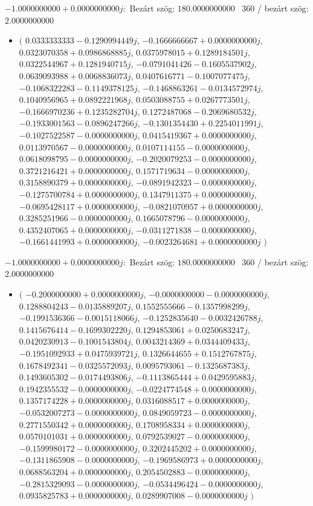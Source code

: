 \documentclass[14pt,a4paper]{article}
\begin{document}
$-1.0000000000+0.0000000000j$:\
Bezárt szög: $180.0000000000$ \
360 / bezárt szög: $2.0000000000$\
\begin{itemize}
\item
$\big($
$0.0333333333-0.1290994449j$, $-0.1666666667+0.0000000000j$, $0.0323070358+0.0986868885j$, $0.0375978015+0.1289184501j$, $0.0322544967+0.1281940715j$, $-0.0791041426-0.1605537902j$, $0.0639093988+0.0068836073j$, $0.0407616771-0.1007077475j$, $-0.1068322283-0.1149378125j$, $-0.1468863261-0.0134572974j$, $0.1040956965+0.0892221968j$, $0.0503088755+0.0267773501j$, $-0.1666970236+0.1235282704j$, $0.1272487068-0.2069680532j$, $-0.1933001563-0.0896247266j$, $-0.1301354430+0.2254011991j$, $-0.1027522587-0.0000000000j$, $0.0415419367+0.0000000000j$, $0.0113970567-0.0000000000j$, $0.0107114155-0.0000000000j$, $0.0618098795-0.0000000000j$, $-0.2020079253-0.0000000000j$, $0.3721216421+0.0000000000j$, $0.1571719634-0.0000000000j$, $0.3158890379+0.0000000000j$, $-0.0891942323-0.0000000000j$, $-0.1275700784+0.0000000000j$, $0.1347911375+0.0000000000j$, $-0.0695428117+0.0000000000j$, $-0.0821070957+0.0000000000j$, $0.3285251966-0.0000000000j$, $0.1665078796-0.0000000000j$, $0.4352407065+0.0000000000j$, $-0.0311271838-0.0000000000j$, $-0.1661441993+0.0000000000j$, $-0.0023264681+0.0000000000j$
$\big)$
\end{itemize}
$-1.0000000000+0.0000000000j$:\
Bezárt szög: $180.0000000000$ \
360 / bezárt szög: $2.0000000000$\
\begin{itemize}
\item
$\big($
$-0.2000000000+0.0000000000j$, $-0.0000000000-0.0000000000j$, $0.1288804243-0.0135889207j$, $0.1552555666-0.1357998299j$, $-0.1991536366-0.0015118066j$, $-0.1252835640-0.0032426788j$, $0.1415676414-0.1699302220j$, $0.1294853061+0.0250683247j$, $0.0420230913-0.1001543804j$, $0.0043214369+0.0344409433j$, $-0.1951092933+0.0475939721j$, $0.1326644655+0.1512767875j$, $0.1678492341-0.0325572093j$, $0.0095793061-0.1325687383j$, $0.1493605302-0.0174493806j$, $-0.1113865444+0.0429595883j$, $0.1942355532-0.0000000000j$, $-0.0224774548+0.0000000000j$, $0.1357174228+0.0000000000j$, $0.0316088517+0.0000000000j$, $-0.0532007273-0.0000000000j$, $0.0849059723-0.0000000000j$, $0.2771550342+0.0000000000j$, $0.1708958334+0.0000000000j$, $0.0570101031+0.0000000000j$, $0.0792539027-0.0000000000j$, $-0.1599980172-0.0000000000j$, $0.3202445202+0.0000000000j$, $-0.1311865908-0.0000000000j$, $-0.1969586973+0.0000000000j$, $0.0688563204+0.0000000000j$, $0.2054502883-0.0000000000j$, $-0.2815329093-0.0000000000j$, $-0.0534496424-0.0000000000j$, $0.0935825783+0.0000000000j$, $0.0289907008-0.0000000000j$
$\big)$
\end{itemize}
\end{document}
